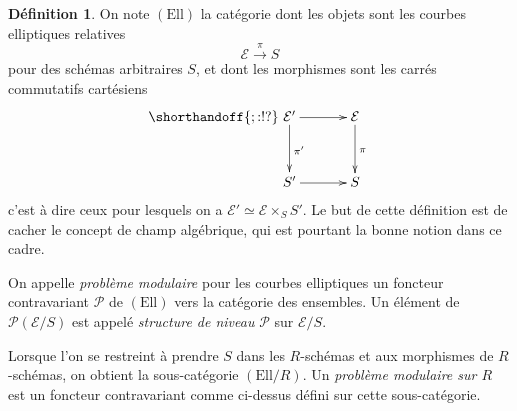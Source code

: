 \documentclass[11pt,a4paper]{article}
\newcommand{\E}{\mathcal{E}}
\renewcommand{\Pr}{\mathcal{P}}
\newcommand{\vers}{\longrightarrow}
\newcommand{\Ell}{\mathrm{Ell}}
\theoremstyle{definition}
\newtheorem*{defi}{Définition}
\begin{document}
\begin{defi}
On note $(\Ell)$ la catégorie dont les objets sont les courbes elliptiques relatives
$$\E \overset{\pi}{\vers} S$$
pour des schémas arbitraires $S$, et dont les morphismes sont les carrés commutatifs cartésiens
$$
\shorthandoff{;:!?}
\xymatrix @!=8mm {
\E' \ar[d]^{\pi'} \ar[r]  & \E \ar[d]^{\pi} \\
 S' \ar[r] & S
}
$$
c'est à dire ceux pour lesquels on a $\E' \simeq \E \times_S S'$. Le but de cette définition est de cacher le concept de champ algébrique, qui est pourtant la bonne notion dans ce cadre.

On appelle \emph{problème modulaire} pour les courbes elliptiques un foncteur contravariant $\Pr$ de $(\Ell)$ vers la catégorie des ensembles. Un élément de $\Pr(\E/S)$ est appelé \emph{structure de niveau} $\Pr$ sur $\E/S$.

Lorsque l'on se restreint à prendre $S$ dans les $R$-schémas et aux morphismes de $R$-schémas, on obtient la sous-catégorie $(\Ell/R)$. Un \emph{problème modulaire sur $R$} est un foncteur contravariant comme ci-dessus défini sur cette sous-catégorie.
\end{defi}
\end{document}
